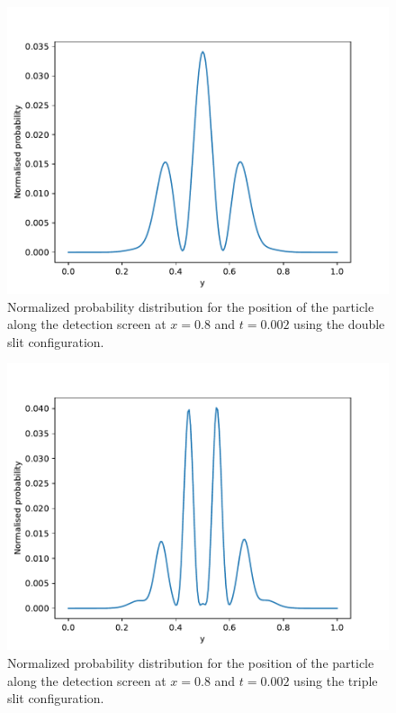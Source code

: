\documentclass[english,notitlepage,reprint,nofootinbib]{revtex4-2}  %
\begin{document}
	\begin{figure}[h!]
		\centering
		\includegraphics[scale=0.55]{figures/problem9_double_slit.pdf}
		\caption{Normalized probability distribution for the position of the particle along the detection screen at $x = 0.8$ and $t = 0.002$ using the double slit configuration.}
		\label{fig:prob9_double}
	\end{figure}
	
	\begin{figure}[H]
		\centering
		\includegraphics[scale=0.55]{figures/problem9_triple_slit.pdf}
		\caption{Normalized probability distribution for the position of the particle along the detection screen at $x = 0.8$ and $t = 0.002$ using the triple slit configuration.}
		\label{fig:prob9_triple}
	\end{figure}
\end{document}
